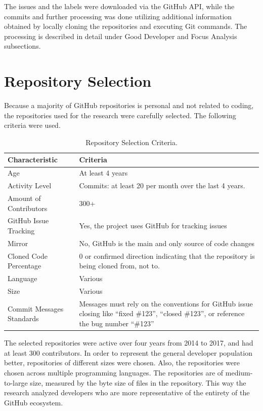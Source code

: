 The issues and the labels were downloaded via the GitHub API, while the commits and further processing was done utilizing additional information obtained by locally cloning the repositories and executing Git commands. The processing is described in detail under Good Developer and Focus Analysis subsections. 

\section{Repository Selection}

Because a majority of GitHub repositories is personal and not related to coding\parencite{perils}, the repositories used for the research were carefully selected. The following criteria were used.

\begin{table}[h!]
\begin{center}
\begin{tabular}{ | m{12em} | m{20em}| } 
\hline
Characteristic & Criteria \\ 
\hline \hline
Age & At least 4 years \\ 
\hline
Activity Level & Commits: at least 20 per month over the last 4 years.  \\ 
\hline
Amount of Contributors & 300+  \\ 
\hline
GitHub Issue Tracking & Yes, the project uses GitHub for tracking issues  \\ 
\hline
Mirror & No, GitHub is the main and only source of code changes  \\ 
\hline
Cloned Code Percentage & 0 or confirmed direction indicating that the repository is being cloned from, not to.  \\ 
\hline
Language & Various  \\ 
\hline
Size & Various  \\ 
\hline
Commit Messages Standards & Messages must rely on the conventions for GitHub issue closing like “fixed \#123”, “closed \#123”, or reference the bug number “\#123”  \\ 
\hline
\end{tabular}
\end{center}
\caption{Repository Selection Criteria.}
\label{table:1}
\end{table}

The selected repositories were active over four years from 2014 to 2017, and had at least 300 contributors. In order to represent the general developer population better, repositories of different sizes were chosen. Also, the repositories were chosen across multiple programming languages. The repositories are of medium-to-large size, measured by the byte size of files in the repository. This way the research analyzed developers who are more representative of the entirety of the GitHub ecosystem. \par

